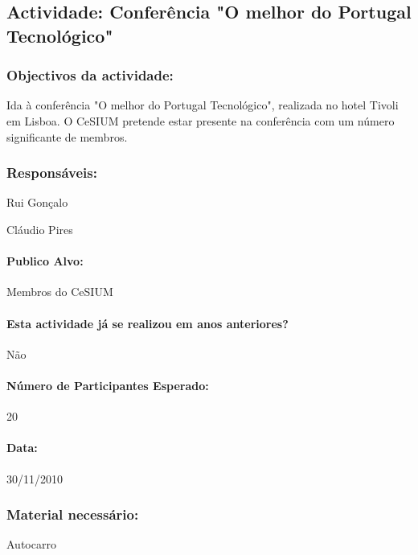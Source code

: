 \subsection{Actividade: Conferência "O melhor do Portugal Tecnológico"} %

\subsubsection*{Objectivos da actividade:}
Ida à conferência "O melhor do Portugal Tecnológico", realizada no hotel Tivoli em Lisboa. O CeSIUM pretende estar presente na conferência com um número significante de membros.

\subsubsection*{Responsáveis:}
\begin{itemizedash}
	\item{Rui Gonçalo}
	\item{Cláudio Pires}
\end{itemizedash}

\paragraph{Publico Alvo: }
Membros do CeSIUM

\paragraph{Esta actividade já se realizou em anos anteriores?}
Não

\paragraph{Número de Participantes Esperado:}
20

\paragraph{Data:} 30/11/2010

\subsubsection*{Material necessário:}
\begin{itemizedash}
	\item{Autocarro}
\end{itemizedash}

